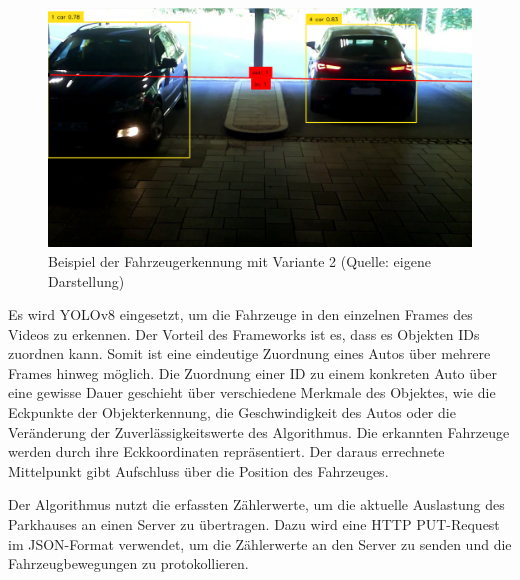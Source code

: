 \begin{figure}[h]
	\myImagePos{}
	\includegraphics[width=\myImageWidth]{Bilder/Method3_Beispiel.png}
	\caption[Fahrzeugerkennung Variante 2 Beispiel]{Beispiel der Fahrzeugerkennung mit Variante 2 (Quelle: eigene Darstellung)}
	\label{fig:Variante2}
\end{figure}

Es wird YOLOv8 eingesetzt, um die Fahrzeuge in den einzelnen Frames des Videos zu erkennen.
Der Vorteil des Frameworks ist es, dass es Objekten IDs zuordnen kann.
Somit ist eine eindeutige Zuordnung eines Autos über mehrere Frames hinweg möglich.
Die Zuordnung einer ID zu einem konkreten Auto über eine gewisse Dauer geschieht über verschiedene Merkmale des Objektes, wie die Eckpunkte der Objekterkennung, die Geschwindigkeit des Autos oder die Veränderung der Zuverlässigkeitswerte des Algorithmus.
Die erkannten Fahrzeuge werden durch ihre Eckkoordinaten repräsentiert.
Der daraus errechnete Mittelpunkt gibt Aufschluss über die Position des Fahrzeuges.

Der Algorithmus nutzt die erfassten Zählerwerte, um die aktuelle Auslastung des Parkhauses an einen Server zu übertragen.
Dazu wird eine HTTP PUT-Request im JSON-Format verwendet, um die Zählerwerte an den Server zu senden und die Fahrzeugbewegungen zu protokollieren.